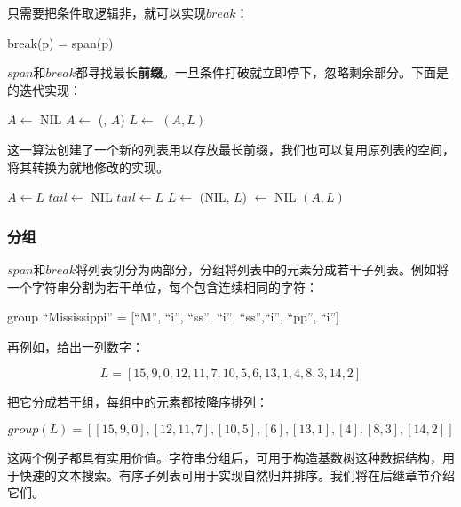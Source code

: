 \documentclass[b5paper]{ctexart}
\begin{document}
只需要把条件取逻辑非，就可以实现$break$：

\be
break(p) = span(\lnot p)
\ee

$span$和$break$都寻找最长\textbf{前缀}。一旦条件打破就立即停下，忽略剩余部分。下面是的迭代实现：

\begin{algorithmic}[1]
  \State $A \gets $ NIL
    \State $A \gets $ (, $A$)
    \State $L \gets $ 
  \EndWhile
  \State \Return $(A, L)$
\EndFunction
\end{algorithmic}

这一算法创建了一个新的列表用以存放最长前缀，我们也可以复用原列表的空间，将其转换为就地修改的实现。

\begin{algorithmic}[1]
  \State $A \gets L$
  \State $tail \gets$ NIL
    \State $tail \gets L$
    \State $L \gets $ 
  \EndWhile
    \State \Return (NIL, $L$)
  \EndIf
  \State {} $\gets$ NIL
  \State \Return $(A, L)$
\EndFunction
\end{algorithmic}

\subsubsection{分组}

$span$和$break$将列表切分为两部分，分组将列表中的元素分成若干子列表。例如将一个字符串分割为若干单位，每个包含连续相同的字符：

\begin{Haskell}
group ``Mississippi'' = [``M'', ``i'', ``ss'', ``i'',
                         ``ss'',``i'', ``pp'', ``i'']
\end{Haskell}

再例如，给出一列数字：

\[
L = [15, 9, 0, 12, 11, 7, 10, 5, 6, 13, 1, 4, 8, 3, 14, 2]
\]

把它分成若干组，每组中的元素都按降序排列：

\[
group(L) = [[15, 9, 0], [12, 11, 7], [10, 5], [6], [13, 1], [4], [8, 3], [14, 2]]
\]

这两个例子都具有实用价值。字符串分组后，可用于构造基数树这种数据结构，用于快速的文本搜索。有序子列表可用于实现自然归并排序。我们将在后继章节介绍它们。
\end{document}
